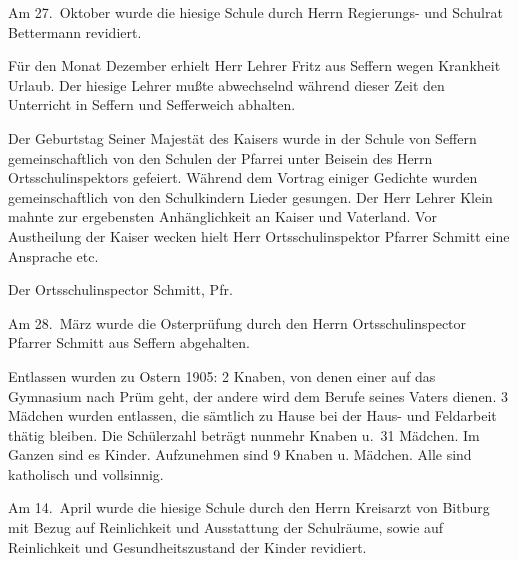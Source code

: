 

\pstart
Am 27.\ Oktober wurde die hiesige Schule durch\ob
Herrn Regierungs- und Schulrat Bettermann\unsicher\ob
revidiert.

\pend
{}
\pstart

Für den Monat Dezember erhielt Herr Lehrer Fritz\ob
aus Seffern wegen Krankheit Urlaub. Der hiesige\ob
Lehrer mußte abwechselnd während dieser Zeit den\ob
Unterricht in Seffern und Sefferweich abhalten.

\pend
{}
\pstart

Der Geburtstag Seiner Majestät des Kaisers wurde\ob
in der Schule von Seffern gemeinschaftlich von den Schulen der Pfarrei unter Beisein des Herrn\ob
Ortsschulinspektors gefeiert. Während dem Vortrag\ob
einiger Gedichte wurden gemeinschaftlich von den\ob
Schulkindern Lieder gesungen. Der Herr Lehrer\ob
Klein\unsicher{} mahnte zur ergebensten Anhänglichkeit an\ob
Kaiser und Vaterland. Vor Austheilung der Kaiser\ohb
wecken hielt Herr Ortsschulinspektor Pfarrer\ob
Schmitt eine Ansprache etc.

\pend
{}
\pstart

Der Ortsschulinspector
Schmitt, Pfr.

\pend
{}
\pstart

Am 28.\ März wurde die Osterprüfung durch den\ob
Herrn Ortsschulinspector Pfarrer Schmitt aus\ob
Seffern abgehalten.

\pend
{}
\pstart

Entlassen wurden zu Ostern 1905: 2 Knaben,\ob
von denen einer auf das Gymnasium nach Prüm\ob
geht, der andere wird dem Berufe seines Vaters\ob
dienen. 3 Mädchen wurden entlassen, die sämtlich\ob
zu Hause bei der Haus- und Feldarbeit thätig\ob
bleiben. Die Schülerzahl beträgt nunmehr Knaben u.\ 31 Mädchen. Im Ganzen sind es Kinder. Aufzunehmen sind 9 Knaben u. Mädchen. Alle sind katholisch und vollsinnig\unsicher.

\pend
{}
\pstart

Am 14.\ April wurde die hiesige Schule durch\ob
den Herrn Kreisarzt von Bitburg mit Bezug auf\ob
Reinlichkeit und Ausstattung der Schulräume,\ob
sowie auf Reinlichkeit und Gesundheitszustand\ob
der Kinder revidiert.
\pend
